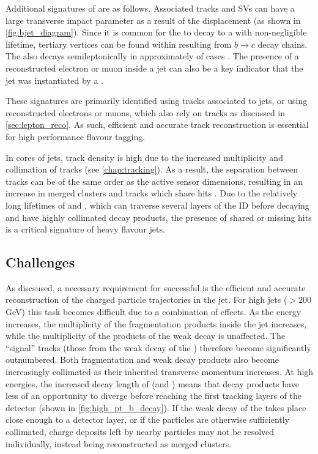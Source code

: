 Additional signatures of \bhadrons are as follows.
Associated tracks and SVs can have a large transverse impact parameter \dzero as a result of the \bhadron displacement (as shown in \cref{fig:bjet_diagram}).
Since it is common for the \bhadron to decay to a \chadron with non-negligible lifetime, tertiary vertices can be found within \bjets resulting from $b \rightarrow c$ decay chains.
The \borchadron also decays semileptonically in approximately  of cases \cite{Workman:2022ynf}.
The presence of a reconstructed electron or muon inside a jet can also be a key indicator that the jet was instantiated by a \bhadron.

These signatures are primarily identified using tracks associated to jets, or using reconstructed electrons or muons, which also rely on tracks as discussed in \cref{sec:lepton_reco}.
As such, efficient and accurate track reconstruction is essential for high performance flavour tagging.

In cores of \highpt jets, track density is high due to the increased multiplicity and collimation of tracks (see \cref{chap:tracking}).
As a result, the separation between tracks can be of the same order as the active sensor dimensions, resulting in an increase in merged clusters and tracks which share hits \cite{PERF-2015-08}.
Due to the relatively long lifetimes of \bhadrons and \chadrons, which can traverse several layers of the ID before decaying and have highly collimated decay products, the presence of shared or missing hits is a critical signature of heavy flavour jets.

\subsection{Challenges}\label{sec:b_track_reco_challenges}

As discsused, a necessary requirement for successful \btagging is the efficient and accurate reconstruction of the charged particle trajectories in the jet.
For high \pT jets (\pT $> 200$ GeV) this task becomes difficult due to a combination of effects.
As the \bjet energy increases, the multiplicity of the fragmentation products inside the jet increases, while the multiplicity of the products of the weak decay is unaffected.
The ``signal'' tracks (those from the weak decay of the \bhadron) therefore become significantly outnumbered.
Both fragmentation and \bhadron weak decay products also become increasingly collimated as their inherited transverse momentum increases.
At high energies, the increased decay length of \bhadrons (and \chadrons) means that decay products have less of an opportunity to diverge before reaching the first tracking layers of the detector (shown in \cref{fig:high_pt_b_decay}).
If the weak decay of the \bhadron takes place close enough to a detector layer, or if the particles are otherwise sufficiently collimated, charge deposits left by nearby particles may not be resolved individually, instead being reconstructed as merged clusters.

